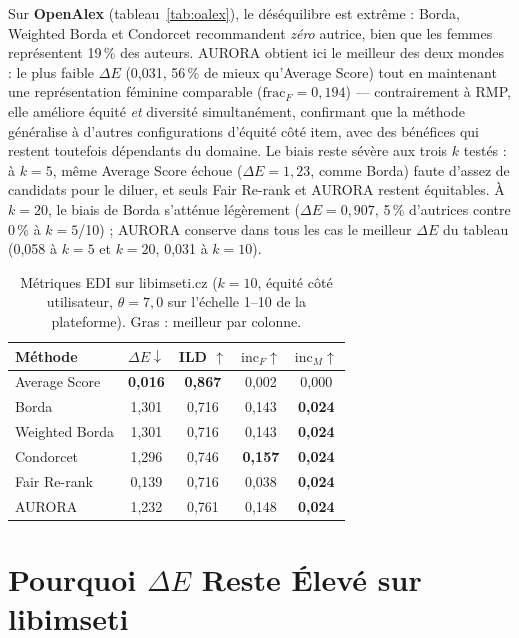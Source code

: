 \documentclass[12pt]{report}
\begin{document}
Sur \textbf{OpenAlex} (tableau~\ref{tab:oalex}), le déséquilibre est
extrême : Borda, Weighted Borda et Condorcet recommandent \emph{zéro}
autrice, bien que les femmes représentent 19\,\% des auteurs. AURORA
obtient ici le meilleur des deux mondes : le plus faible $\Delta E$
(0,031, 56\,\% de mieux qu'Average Score) tout en maintenant une
représentation féminine comparable ($\mathrm{frac}_F=0{,}194$) ---
contrairement à RMP, elle améliore équité \emph{et} diversité
simultanément, confirmant que la méthode généralise à d'autres
configurations d'équité côté item, avec des bénéfices qui restent
toutefois dépendants du domaine. Le biais reste sévère aux trois $k$
testés : à $k=5$, même Average Score échoue ($\Delta E=1{,}23$, comme
Borda) faute d'assez de candidats pour le diluer, et seuls Fair Re-rank
et AURORA restent équitables. À $k=20$, le biais de Borda s'atténue
légèrement ($\Delta E=0{,}907$, 5\,\% d'autrices contre 0\,\% à $k=5$/10) ;
AURORA conserve dans tous les cas le meilleur $\Delta E$ du tableau
(0,058 à $k=5$ et $k=20$, 0,031 à $k=10$).

\begin{table}[h!]
\caption{Métriques EDI sur libimseti.cz ($k=10$, équité côté utilisateur,
$\theta=7{,}0$ sur l'échelle 1--10 de la plateforme). Gras : meilleur par
colonne.}
\label{tab:libimseti}
\centering
\begin{tabular}{lcccc}
\hline
Méthode & $\Delta E \downarrow$ & ILD $\uparrow$ &
$\mathrm{inc}_F \uparrow$ & $\mathrm{inc}_M \uparrow$ \\
\hline
Average Score  & \textbf{0,016} & \textbf{0,867} & 0,002 & 0,000 \\
Borda          & 1,301 & 0,716 & 0,143 & \textbf{0,024} \\
Weighted Borda & 1,301 & 0,716 & 0,143 & \textbf{0,024} \\
Condorcet      & 1,296 & 0,746 & \textbf{0,157} & \textbf{0,024} \\
Fair Re-rank   & 0,139 & 0,716 & 0,038 & \textbf{0,024} \\
AURORA           & 1,232 & 0,761 & 0,148 & \textbf{0,024} \\
\hline
\end{tabular}
\end{table}

\section{Pourquoi $\Delta E$ Reste Élevé sur libimseti}
\label{sec:libimseti-limitation}
\end{document}
